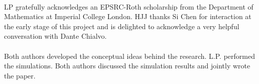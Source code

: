 \documentclass[aps,prl,showpacs,superscriptaddress,groupedaddress,notitlepage]{revtex4-1}
\begin{document}





\vspace{6pt} 


\\
LP gratefully acknowledges an EPSRC-Roth scholarship from the Department of Mathematics at Imperial College London. HJJ thanks Si Chen for interaction at the early stage of this project and is delighted to acknowledge a very helpful conversation with Dante Chialvo.\\

\\
{Both authors developed the conceptual ideas behind the research. L.P. performed the simulations. Both authors discussed the simulation results and jointly wrote the paper.}\\
\end{document}
